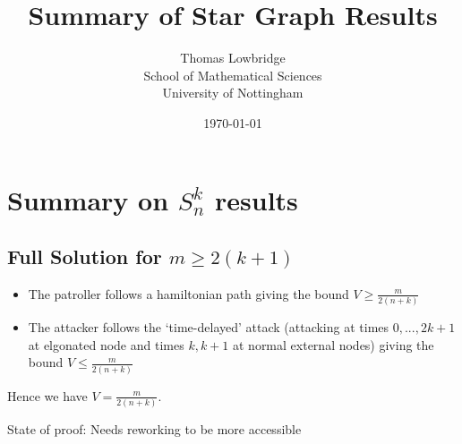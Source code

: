 \documentclass[a4paper,10pt]{article}
\title{Summary of Star Graph Results}
\date{\today}
\author{Thomas Lowbridge \\ School of Mathematical Sciences \\ University of Nottingham}
\theoremstyle{definition}
\theoremstyle{definition}
\theoremstyle{remark}
\theoremstyle{definition}
\begin{document}
\pagestyle{empty}
{
  \renewcommand{\thispagestyle}[1]{}
  \maketitle
  \tableofcontents  
}
\clearpage
\pagestyle{plain}


\setlength{\parindent}{0pt}
\setlength{\parskip}{1em}

\newpage
{}
\section[]{Summary on $S_{n}^k$ results}

\subsection[]{Full Solution for $m \geq 2(k+1)$}
\begin{itemize}
\item The patroller follows a hamiltonian path giving the bound $V \geq \frac{m}{2(n+k)}$
\item The attacker follows the `time-delayed' attack (attacking at times $0,...,2k+1$ at elgonated node and times $k,k+1$ at normal external nodes) giving the bound $V \leq \frac{m}{2(n+k)}$
\end{itemize}

Hence we have $V= \frac{m}{2(n+k)}$.

State of proof: Needs reworking to be more accessible
\end{document}
